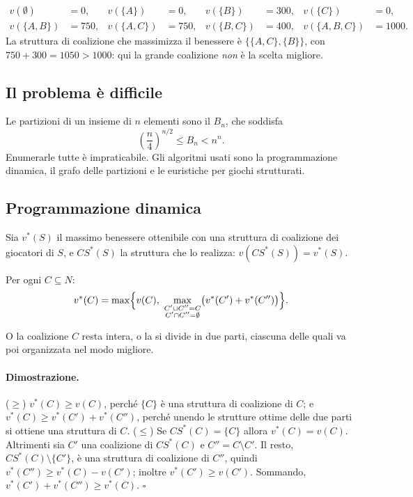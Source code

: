 \begin{esempio}
\[
\begin{aligned}
  v(\emptyset) &= 0, & v(\{A\}) &= 0, & v(\{B\}) &= 300, & v(\{C\}) &= 0,\\
  v(\{A,B\}) &= 750, & v(\{A,C\}) &= 750, & v(\{B,C\}) &= 400, & v(\{A,B,C\}) &= 1000.
\end{aligned}
\]
La struttura di coalizione che massimizza il benessere è $\{\{A,C\}, \{B\}\}$, con
$750 + 300 = 1050 > 1000$: qui la grande coalizione \emph{non} è la scelta migliore.
\end{esempio}

\subsection{Il problema è difficile}

Le partizioni di un insieme di $n$ elementi sono il  $B_n$, che soddisfa
\[
  \left(\frac{n}{4}\right)^{n/2} \le B_n < n^n .
\]
Enumerarle tutte è impraticabile. Gli algoritmi usati sono la programmazione dinamica, il
grafo delle partizioni e le euristiche per giochi strutturati.

\subsection{Programmazione dinamica}

Sia $v^*(S)$ il massimo benessere ottenibile con una struttura di coalizione dei giocatori
di $S$, e $CS^*(S)$ la struttura che lo realizza: $v(CS^*(S)) = v^*(S)$.

\begin{teorema}
Per ogni $C \subseteq N$:
\[
  v^*(C) = \max\Bigl\{ v(C),\ \max_{\substack{C' \cup C'' = C\\ C' \cap C'' = \emptyset}}
            \bigl(v^*(C') + v^*(C'')\bigr) \Bigr\}.
\]
\end{teorema}
O la coalizione $C$ resta intera, o la si divide in due parti, ciascuna delle quali va poi
organizzata nel modo migliore.

\paragraph{Dimostrazione.}
($\ge$) $v^*(C) \ge v(C)$, perché $\{C\}$ è una struttura di coalizione di $C$; e
$v^*(C) \ge v^*(C') + v^*(C'')$, perché unendo le strutture ottime delle due parti si ottiene
una struttura di $C$.
($\le$) Se $CS^*(C) = \{C\}$ allora $v^*(C) = v(C)$. Altrimenti sia $C'$ una coalizione di
$CS^*(C)$ e $C'' = C \setminus C'$. Il resto, $CS^*(C) \setminus \{C'\}$, è una struttura
di coalizione di $C''$, quindi $v^*(C'') \ge v^*(C) - v(C')$; inoltre
$v^*(C') \ge v(C')$. Sommando, $v^*(C') + v^*(C'') \ge v^*(C)$. $\square$

